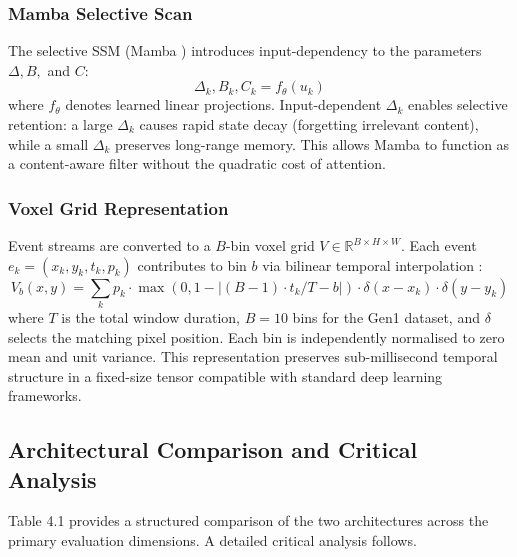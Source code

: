 \documentclass[11pt, a4paper]{report}
\begin{document}
\subsubsection{Mamba Selective Scan}
The selective SSM (Mamba \cite{gu2023mamba}) introduces input-dependency to the parameters $\Delta, B,$ and $C$:
\begin{equation}
    \Delta_k, B_k, C_k = f_\theta(u_k)
\end{equation}
where $f_\theta$ denotes learned linear projections. Input-dependent $\Delta_k$ enables selective retention: a large $\Delta_k$ causes rapid state decay (forgetting irrelevant content), while a small $\Delta_k$ preserves long-range memory. This allows Mamba to function as a content-aware filter without the quadratic cost of attention.

\subsubsection{Voxel Grid Representation}
Event streams are converted to a $B$-bin voxel grid $V \in \mathbb{R}^{B \times H \times W}$. Each event $e_k = (x_k, y_k, t_k, p_k)$ contributes to bin $b$ via bilinear temporal interpolation \cite{zhu2019unsupervised}:
\begin{equation}
    V_b(x, y) = \sum_k p_k \cdot \max(0, 1 - |(B-1) \cdot t_k / T - b|) \cdot \delta(x-x_k) \cdot \delta(y-y_k)
\end{equation}
where $T$ is the total window duration, $B=10$ bins for the Gen1 dataset, and $\delta$ selects the matching pixel position. Each bin is independently normalised to zero mean and unit variance. This representation preserves sub-millisecond temporal structure in a fixed-size tensor compatible with standard deep learning frameworks.

\subsection{Architectural Comparison and Critical Analysis}
Table 4.1 provides a structured comparison of the two architectures across the primary evaluation dimensions. A detailed critical analysis follows. 
\end{document}
